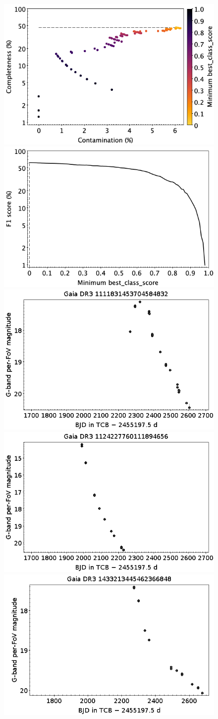 \documentclass[longauth]{aa}
\begin{document}
\begin{appendix}
\begin{figure}
\centering
{} \includegraphics[width=0.45\hsize]{figures/appendix/SN_cls_scc.png}  
\hspace{2mm}
 \includegraphics[width=0.45\hsize]{figures/appendix/SN_cls_sf1.png} \\ 
\vspace{4mm}
 \includegraphics[width=0.45\hsize]{figures/appendix/SN-11.png}  
\hspace{2mm}
 \includegraphics[width=0.45\hsize]{figures/appendix/SN-13.png} \\
\vspace{4mm}
 \includegraphics[width=0.45\hsize]{figures/appendix/SN-52.png}  

\end{figure}
\end{appendix}
\end{document}
